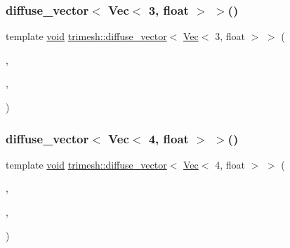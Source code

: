 \subsubsection{\texorpdfstring{diffuse\+\_\+vector$<$ Vec$<$ 3, float $>$ $>$()}{diffuse\_vector< Vec< 3, float > >()}}
{\footnotesize\ttfamily template \hyperlink{namespacetrimesh_a784ddfd979e1c579bda795a8edfc3f43}{void} \hyperlink{namespacetrimesh_a8fa6ac94a71d33cb6e11c29e76501519}{trimesh\+::diffuse\+\_\+vector}$<$ \hyperlink{classtrimesh_1_1Vec}{Vec}$<$ 3, float $>$ $>$ (\begin{DoxyParamCaption}\item[{\hyperlink{classtrimesh_1_1TriMesh}{Tri\+Mesh} $\ast$}]{,  }\item[{vector$<$ \hyperlink{classtrimesh_1_1Vec}{Vec}$<$ 3, float $>$ $>$ \&}]{,  }\item[{float}]{ }\end{DoxyParamCaption})}

\mbox{\label{namespacetrimesh_ac4bffaf28cf5ae024955368b90a9d0e6}} 
\subsubsection{\texorpdfstring{diffuse\+\_\+vector$<$ Vec$<$ 4, float $>$ $>$()}{diffuse\_vector< Vec< 4, float > >()}}
{\footnotesize\ttfamily template \hyperlink{namespacetrimesh_a784ddfd979e1c579bda795a8edfc3f43}{void} \hyperlink{namespacetrimesh_a8fa6ac94a71d33cb6e11c29e76501519}{trimesh\+::diffuse\+\_\+vector}$<$ \hyperlink{classtrimesh_1_1Vec}{Vec}$<$ 4, float $>$ $>$ (\begin{DoxyParamCaption}\item[{\hyperlink{classtrimesh_1_1TriMesh}{Tri\+Mesh} $\ast$}]{,  }\item[{vector$<$ \hyperlink{classtrimesh_1_1Vec}{Vec}$<$ 4, float $>$ $>$ \&}]{,  }\item[{float}]{ }\end{DoxyParamCaption})}

\mbox{\label{namespacetrimesh_a4feb8070f9a75a776c06f029972fc9e1}} 
